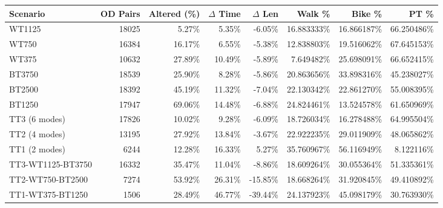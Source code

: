 \begin{tabular}{lrrrrrrr}
\hline
Scenario & OD Pairs & Altered (\%) & $\Delta$ Time & $\Delta$ Len & Walk \% & Bike \% & PT \% \\
\hline
WT1125 & 18025 & 5.27\% & 5.35\% & -6.05\% & 16.883333\% & 16.866187\% & 66.250486\% \\
WT750 & 16384 & 16.17\% & 6.55\% & -5.38\% & 12.838803\% & 19.516062\% & 67.645153\% \\
WT375 & 10632 & 27.89\% & 10.49\% & -5.89\% & 7.649482\% & 25.698091\% & 66.652415\% \\
BT3750 & 18539 & 25.90\% & 8.28\% & -5.86\% & 20.863656\% & 33.898316\% & 45.238027\% \\
BT2500 & 18392 & 45.19\% & 11.32\% & -7.04\% & 22.130342\% & 22.861270\% & 55.008395\% \\
BT1250 & 17947 & 69.06\% & 14.48\% & -6.88\% & 24.824461\% & 13.524578\% & 61.650969\% \\
TT3 (6 modes) & 17826 & 10.02\% & 9.28\% & -6.09\% & 18.726034\% & 16.278488\% & 64.995504\% \\
TT2 (4 modes) & 13195 & 27.92\% & 13.84\% & -3.67\% & 22.922235\% & 29.011909\% & 48.065862\% \\
TT1 (2 modes) & 6244 & 12.28\% & 16.33\% & 5.27\% & 35.760967\% & 56.116949\% & 8.122116\% \\
TT3-WT1125-BT3750 & 16332 & 35.47\% & 11.04\% & -8.86\% & 18.609264\% & 30.055364\% & 51.335361\% \\
TT2-WT750-BT2500 & 7274 & 53.92\% & 26.31\% & -15.85\% & 18.668264\% & 31.920845\% & 49.410892\% \\
TT1-WT375-BT1250 & 1506 & 28.49\% & 46.77\% & -39.44\% & 24.137923\% & 45.098179\% & 30.763930\% \\
\hline
\end{tabular}
